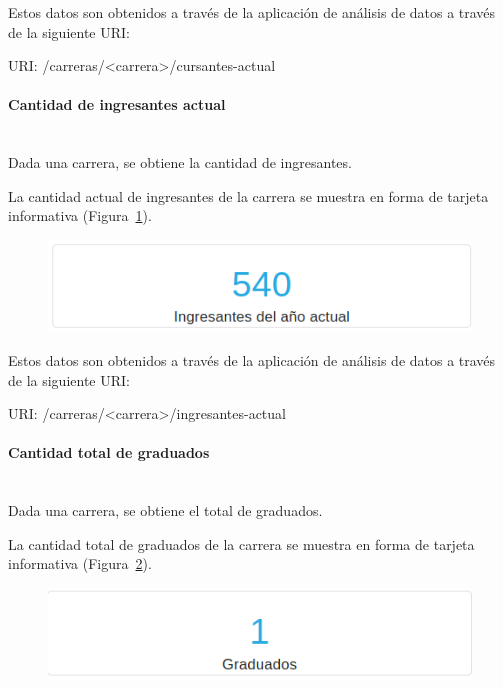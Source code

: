 Estos datos son obtenidos a través de la aplicación de análisis de datos a través de la siguiente URI:

URI: /carreras/<carrera>/cursantes-actual \\


\paragraph{Cantidad de ingresantes actual}\mbox{}\\
Dada una carrera, se obtiene la cantidad de ingresantes.

La cantidad actual de ingresantes de la carrera se muestra en forma de tarjeta informativa (Figura~\ref{fig:sa-ingresantes}).

\begin{figure}[H]
  \centering
    \includegraphics[scale=0.4]{images/seguimiento-academico/sa-ingresantes.png}
  \label{fig:sa-ingresantes}
\end{figure}

Estos datos son obtenidos a través de la aplicación de análisis de datos a través de la siguiente URI:

URI: /carreras/<carrera>/ingresantes-actual \\



\paragraph{Cantidad total de graduados} \mbox{}\\

Dada una carrera, se obtiene el total de graduados.

La cantidad total de graduados de la carrera se muestra en forma de tarjeta informativa (Figura~\ref{fig:sa-graduados}).

\begin{figure}[H]
  \centering
    \includegraphics[scale=0.4]{images/seguimiento-academico/sa-graduados.png}
  \label{fig:sa-graduados}
\end{figure}

